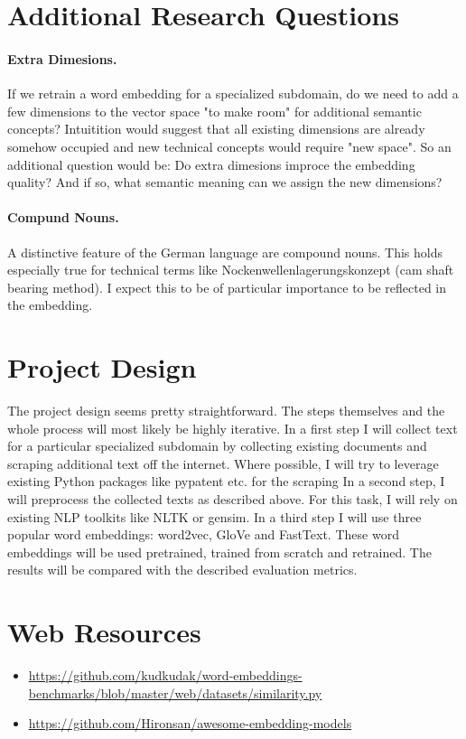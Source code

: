 \documentclass[10pt,a4paper]{article}
\begin{document}
	\section{Additional Research Questions}
	\paragraph{Extra Dimesions.} If we retrain a word embedding for a specialized subdomain, do we need to add a few dimensions to the vector space "to make room" for additional semantic concepts? Intuitition would suggest that all existing dimensions are already somehow occupied and new technical concepts would require "new space". So an additional question would be: Do extra dimesions improce the embedding quality? And if so, what semantic meaning can we assign the new dimensions? 
	\paragraph{Compund Nouns.} A distinctive feature of the German language are compound nouns. This holds especially true for technical terms like Nockenwellenlagerungskonzept (cam shaft bearing method). I expect this to be of particular importance to be reflected in the embedding. 
	
	
		
	\section{Project Design}
	The project design  seems pretty straightforward. The steps themselves and the whole process will most likely be highly iterative.
	In a first step I will collect text for a particular specialized subdomain by collecting existing documents and scraping additional text off the internet. Where possible, I will try to leverage existing Python packages like pypatent etc. for the scraping
	In a second step, I will preprocess the collected texts as described above. For this task, I will rely on existing NLP toolkits like NLTK or gensim.
	In a third step I will use three popular word embeddings: word2vec, GloVe and FastText. These word embeddings will be used pretrained, trained from scratch and retrained. The results will be compared with the described evaluation metrics.	
	

\section{Web Resources}
\label{web_resources}
\begin{itemize}
	\item \url{https://github.com/kudkudak/word-embeddings-benchmarks/blob/master/web/datasets/similarity.py}
	\item \url{https://github.com/Hironsan/awesome-embedding-models}
\end{itemize}



\nocite{*}




	
	
\end{document}
